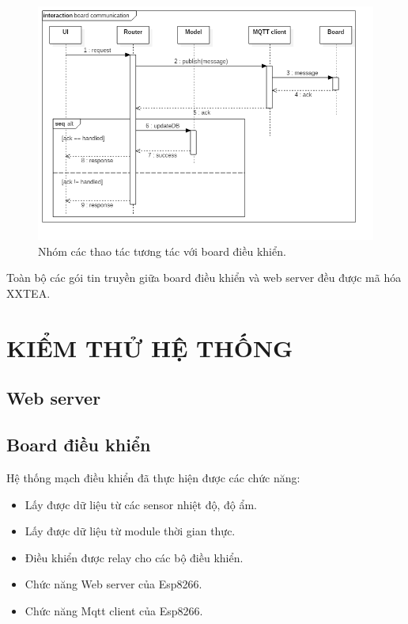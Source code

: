 \documentclass[a4paper,12pt,oneside]{article}
\begin{document}
\begin{figure}[H]
\begin{center}
\includegraphics[scale=.6]{hinh/seq-board-communication.png}
\end{center}
\caption{Nhóm các thao tác tương tác với board điều khiển.}
\end{figure}

\noindent Toàn bộ các gói tin truyền giữa board điều khiển và web server đều được mã hóa XXTEA.

\newpage
\section{KIỂM THỬ HỆ THỐNG}
\subsection{Web server}

\subsection{Board điều khiển}
Hệ thống mạch điều khiển đã thực hiện được các chức năng:
\begin{itemize}
\item Lấy được dữ liệu từ các sensor nhiệt độ, độ ẩm.
\item Lấy được dữ liệu từ module thời gian thực.
\item Điều khiển được relay cho các bộ điều khiển.
\item Chức năng Web server của Esp8266.
\item Chức năng Mqtt client của Esp8266.
\end{itemize}
\end{document}
